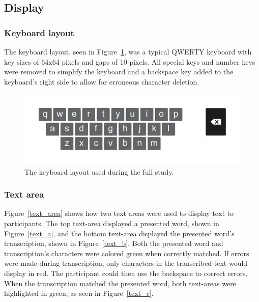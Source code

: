 \subsection{Display}
\subsubsection{Keyboard layout}
The keyboard layout, seen in Figure~\ref{keyboard_layout}, was a typical QWERTY keyboard with key sizes of 64x64 pixels and gaps of 10 pixels. All special keys and number keys were removed to simplify the keyboard and a backspace key added to the keyboard's right side to allow for erroneous character deletion.

\begin{figure}[t]
	\centering
	\includegraphics[width=6in]{Figures/fig_final_keyboard}
	\caption[Display: Keyboard Layout]{The keyboard layout used during the full study.}
	\label{keyboard_layout}
\end{figure}

\subsubsection{Text area}
Figure~\ref{text_area} shows how two text areas were used to display text to participants. The top text-area displayed a presented word, shown in Figure~\ref{text_a}, and the bottom text-area displayed the presented word's transcription, shown in Figure~\ref{text_b}. Both the presented word and transcription's characters were colored green when correctly matched. If errors were made during transcription, only characters in the transcribed text would display in red. The participant could then use the backspace to correct errors. When the transcription matched the presented word, both text-areas were highlighted in green, as seen in Figure~\ref{text_c}.

